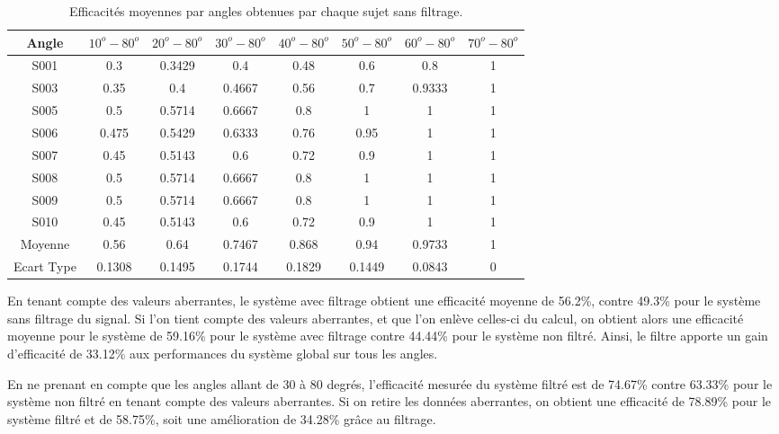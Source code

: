 \documentclass[letterpaper, twoside, 12pt, memoire, creativecommons, hyperref]{thETS}
\begin{document}
\begin{table}[ht]
	\caption{Efficacités moyennes par angles obtenues par chaque sujet sans filtrage. }
		\begin{tabular}{|c|c|c|c|c|c|c|c|}
		\hline
			Angle & $10^{o}-80^{o}$ & $20^{o}-80^{o}$ & $30^{o}-80^{o}$ & $40^{o}-80^{o}$ & $50^{o}-80^{o}$ & $60^{o}-80^{o}$ & $70^{o}-80^{o}$ \\
	    \hline
	    		S001 & 0.3 & 0.3429 & 0.4 & 0.48 & 0.6 & 0.8 & 1\\
	    \hline
	    		S003 & 0.35 & 0.4 & 0.4667 & 0.56 & 0.7 & 0.9333 & 1\\
	    \hline
	    		S005 & 0.5 & 0.5714 & 0.6667 & 0.8 & 1 & 1 & 1\\
	    \hline
	    		S006 & 0.475 & 0.5429 & 0.6333 & 0.76 & 0.95 & 1 & 1\\
	    \hline
	    		S007 & 0.45 & 0.5143 & 0.6 & 0.72 & 0.9 & 1 & 1\\
	    \hline
	    		S008 & 0.5 & 0.5714 & 0.6667 & 0.8 & 1 & 1 & 1\\
	    \hline
	    		S009 & 0.5 & 0.5714 & 0.6667 & 0.8 & 1 & 1 & 1\\
	    \hline
	    		S010 & 0.45 & 0.5143 & 0.6 & 0.72 & 0.9 & 1 & 1\\
	    \hline
	    		Moyenne  & 0.56 & 0.64 & 0.7467 & 0.868 & 0.94 & 0.9733 & 1\\
	    \hline
	    		Ecart Type & 0.1308 & 0.1495 & 0.1744 & 0.1829 & 0.1449 & 0.0843 & 0\\
	    \hline
		\end{tabular}
	\label{tab:effFinterval}
\end{table}

En tenant compte des valeurs aberrantes, le système avec filtrage obtient une efficacité moyenne de 56.2\%, contre 49.3\% pour le système sans filtrage du signal. Si l'on tient compte des valeurs aberrantes, et que l'on enlève celles-ci du calcul, on obtient alors une efficacité moyenne pour le système de 59.16\% pour le système avec filtrage contre 44.44\% pour le système non filtré. Ainsi, le filtre apporte un gain d'efficacité de 33.12\% aux performances du système global sur tous les angles.

En ne prenant en compte que les angles allant de 30 à 80 degrés, l'efficacité mesurée du système filtré est de 74.67\% contre 63.33\% pour le système non filtré en tenant compte des valeurs aberrantes. Si on retire les données aberrantes, on obtient une efficacité de 78.89\% pour le système filtré et de 58.75\%, soit une amélioration de 34.28\% grâce au filtrage.
\end{document}
